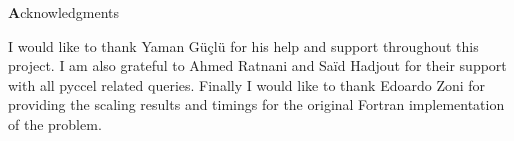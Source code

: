 \clearemptydoublepage
{}
{}

\vspace*{2cm}

\begin{center}
{\Large \textbf Acknowledgments}
\end{center}

\vspace{1cm}

\begin{center}
I would like to thank Yaman G\"u\c{c}l\"u for his help and support throughout this project. I am also grateful to Ahmed Ratnani and Sa\"id Hadjout for their support with all pyccel related queries. Finally I would like to thank Edoardo Zoni for providing the scaling results and timings for the original Fortran implementation of the problem.
\end{center}
